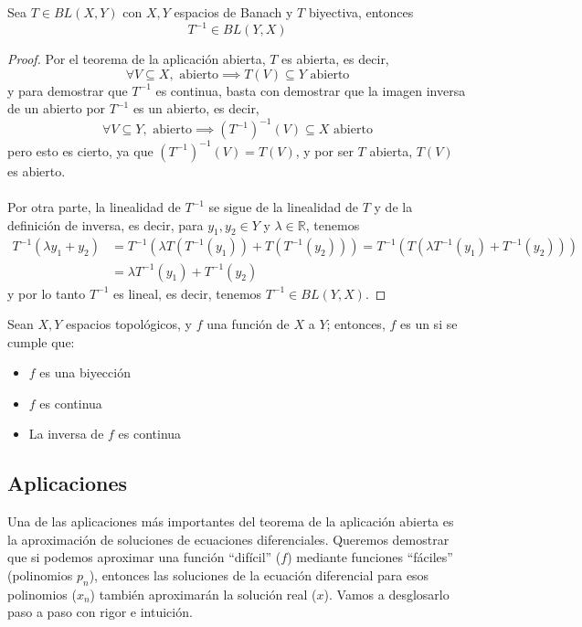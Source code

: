 \begin{coro}
    Sea $T\in BL(X, Y)$ con $X, Y$ espacios de Banach y $T$ biyectiva, entonces
    $$T^{-1} \in BL(Y, X)$$
\begin{proof}
    Por el teorema de la aplicación abierta, $T$ es abierta, es decir, 
    \begin{equation*}
        \forall V\subseteq X, \text{ abierto} \implies T(V) \subseteq Y \text{ abierto}
    \end{equation*}
    y para demostrar que $T^{-1}$ es continua, basta con demostrar que la imagen inversa de un abierto por $T^{-1}$ es un abierto, es decir,
    \begin{equation*}
        \forall V \subseteq Y, \text{ abierto} \implies (T^{-1})^{-1}(V) \subseteq X \text{ abierto}
    \end{equation*}
    pero esto es cierto, ya que $(T^{-1})^{-1}(V) = T(V)$, y por ser $T$ abierta, $T(V)$ es abierto. \\ \\
    \noindent
    Por otra parte, la linealidad de $T^{-1}$ se sigue de la linealidad de $T$ y de la definición de inversa, es decir, para $y_1, y_2 \in Y$ y $\lambda \in \mathbb{R}$, tenemos
    \begin{align*}
        T^{-1}(\lambda y_1 + y_2) & = T^{-1}(\lambda T(T^{-1}(y_1)) + T(T^{-1}(y_2))) = T^{-1}(T(\lambda T^{-1}(y_1) + T^{-1}(y_2))) \\
        & = \lambda T^{-1}(y_1) + T^{-1}(y_2)
    \end{align*}
    y por lo tanto $T^{-1}$ es lineal, es decir, tenemos $T^{-1} \in BL(Y, X)$.
\end{proof}
\end{coro}

\begin{definicion}

    Sean $X, Y$ espacios topológicos, y $f$ una función de $X$ a $Y$; entonces, $f$ es un  si se cumple que:
    \begin{itemize}
        \item $f$ es una biyección
        \item $f$ es continua
        \item La inversa de $f$ es continua
    \end{itemize}
\end{definicion}

\subsection{Aplicaciones}
\noindent
Una de las aplicaciones más importantes del teorema de la aplicación abierta es la aproximación de soluciones de ecuaciones diferenciales. Queremos demostrar que si podemos aproximar una función ``difícil'' ($f$) mediante funciones ``fáciles'' (polinomios $p_n$), entonces las soluciones de la ecuación diferencial para esos polinomios ($x_n$) también aproximarán la solución real ($x$).  Vamos a desglosarlo paso a paso con rigor e intuición. \\ 

